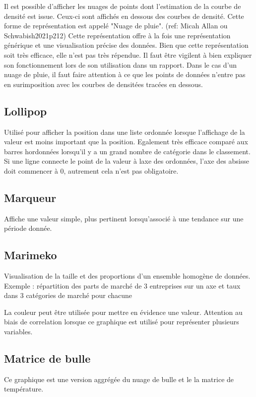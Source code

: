\documentclass[a4paper,12pt]{article}
\begin{document}
\begin{multicols}{2}
Il est possible d'afficher les nuages de points dont l'estimation de la courbe de densité est issue. Ceux-ci sont affichés en dessous des courbes de densité. Cette forme de représentation est appelé "Nuage de pluie". (ref: Micah Allan ou Schwabish2021p212) Cette représentation offre à la fois une représentation générique et une visualisation précise des données. \autocite{jonathanschwabishDistribution2021} Bien que cette représentation soit très efficace, elle n'est pas très répendue. \autocite{jonathanschwabishDistribution2021} Il faut être vigilent à bien expliquer son fonctionnement lors de son utilisation dans un rapport. Dans le cas d'un nuage de pluie, il faut faire attention à ce que les points de données n'entre pas en surimposition avec les courbes de densitées tracées en dessous.
\subsection*{Lollipop}
\label{sec:orgcf6d164}
Utilisé pour afficher la position dans une liste ordonnée lorsque l'affichage de la valeur est moins important que la position. \autocite{alansmithLexiqueVisuel} Egalement très efficace comparé aux barres hordonnées lorsqu'il y a un grand nombre de catégorie dans le classement. \autocite{mikeyiHowChooseRight2020}  Si une ligne connecte le point de la valeur à laxe des ordonnées, l'axe des absisse doit commencer à 0, autrement cela n'est pas obligatoire.
\subsection*{Marqueur}
\label{sec:org9125090}
Affiche une valeur simple, plus pertinent lorsqu'associé à une tendance sur une période donnée. \autocite{mikeyiHowChooseRight2020}
\subsection*{Marimeko}
\label{sec:org995f5f1}
Visualisation de la taille et des proportions d'un ensemble homogène de données. \autocite{alansmithLexiqueVisuel}
Exemple : répartition des parts de marché de 3 entreprises sur un axe et taux dans 3 catégories de marché pour chacune

La couleur peut être utilisée pour mettre en évidence une valeur. \autocite{jonathanschwabishComparingCategories2021} Attention au biais de correlation lorsque ce graphique est utilisé pour représenter plusieurs variables. \autocite{jonathanschwabishComparingCategories2021}
\subsection*{Matrice de bulle}
\label{sec:orgb915dd1}
Ce graphique est une version aggrégée du nuage de bulle et le la matrice de température.


\end{multicols}
\end{document}
